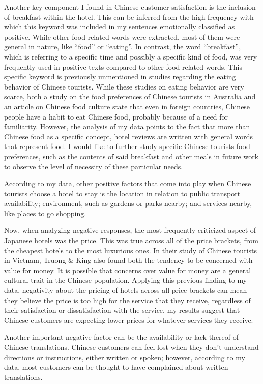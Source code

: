 \documentclass[review]{elsarticle}
\begin{document}
Another key component I found in Chinese customer satisfaction is the inclusion of breakfast within the hotel. This can be inferred from the high frequency with which this keyword was included in my sentences emotionally classified as positive. While other food-related words were extracted, most of them were general in nature, like “food” or “eating”. In contrast, the word “breakfast”, which is referring to a specific time and possibly a specific kind of food, was very frequently used in positive texts compared to other food-related words. This specific keyword is previously unmentioned in studies regarding the eating behavior of Chinese tourists. While these studies on eating behavior are very scarce, both a study on the food preferences of Chinese tourists in Australia \cite{chang2010} and an article on Chinese food culture \cite{ma2015} state that even in foreign countries, Chinese people have a habit to eat Chinese food, probably because of a need for familiarity. However, the analysis of my data points to the fact that more than Chinese food as a specific concept, hotel reviews are written with general words that represent food. I would like to further study specific Chinese tourists food preferences, such as the contents of said breakfast and other meals in future work to observe the level of necessity of these particular needs.

According to my data, other positive factors that come into play when Chinese tourists choose a hotel to stay is the location in relation to public transport availability; environment, such as gardens or parks nearby; and services nearby, like places to go shopping.

Now, when analyzing negative responses, the most frequently criticized aspect of Japanese hotels was the price. This was true across all of the price brackets, from the cheapest hotels to the most luxurious ones. In their study of Chinese tourists in Vietnam, Truong \& King \cite{truong2009} also found both the tendency to be concerned with value for money. It is possible that concerns over value for money are a general cultural trait in the Chinese population. Applying this previous finding to my data, negativity about the pricing of hotels across all price brackets can mean they believe the price is too high for the service that they receive, regardless of their satisfaction or dissatisfaction with the service. my results suggest that Chinese customers are expecting lower prices for whatever services they receive.

Another important negative factor can be the availability or lack thereof of Chinese translations. Chinese customers can feel lost when they don't understand directions or instructions, either written or spoken; however, according to my data, most customers can be thought to have complained about written translations. 
\end{document}

